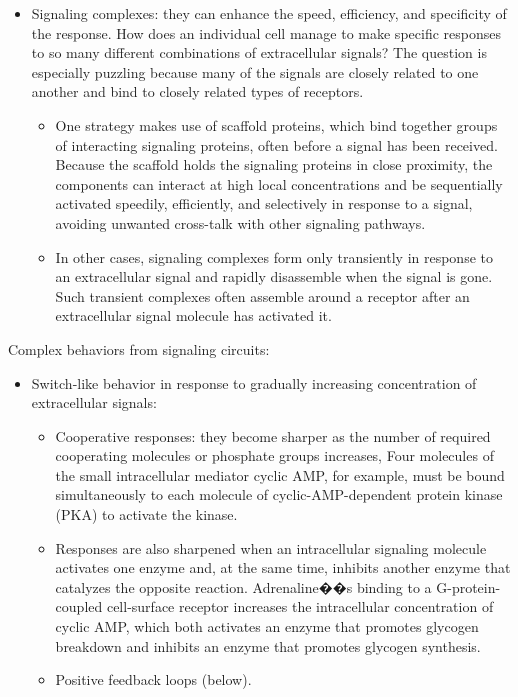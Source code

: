 \documentclass{report}
\begin{document}
\begin{enumerate}
\begin{itemize}
\item Signaling complexes: they can enhance the speed, efficiency, and specificity of the response. How does an individual cell manage to make specific responses to so many different combinations of extracellular signals? The question is especially puzzling because many of the signals are closely related to one another and bind to closely related types of receptors. 
\begin{itemize}
	\item One strategy makes use of scaffold proteins, which bind together groups of interacting signaling proteins, often before a signal has been received. Because the scaffold holds the signaling proteins in close proximity, the components can interact at high local concentrations and be sequentially activated speedily, efficiently, and selectively in response to a signal, avoiding unwanted cross-talk with other signaling pathways.
	\item In other cases, signaling complexes form only transiently in response to an extracellular signal and rapidly disassemble when the signal is gone. Such transient complexes often assemble around a receptor after an extracellular signal molecule has activated it.
\end{itemize}

\end{itemize}

Complex behaviors from signaling circuits: 
\begin{itemize}
\item Switch-like behavior in response to gradually increasing concentration of extracellular signals: 
\begin{itemize}
	\item Cooperative responses: they become sharper as the number of required cooperating molecules or phosphate groups increases, Four molecules of the small intracellular mediator cyclic AMP, for example, must be bound simultaneously to each molecule of cyclic-AMP-dependent protein kinase (PKA) to activate the kinase. 
	\item Responses are also sharpened when an intracellular signaling molecule activates one enzyme and, at the same time, inhibits another enzyme that catalyzes the opposite reaction. Adrenaline��s binding to a G-protein-coupled cell-surface receptor increases the intracellular concentration of cyclic AMP, which both activates an enzyme that promotes glycogen breakdown and inhibits an enzyme that promotes glycogen synthesis.
	\item Positive feedback loops (below). 
\end{itemize}


\end{itemize}
\end{enumerate}
\end{document}
